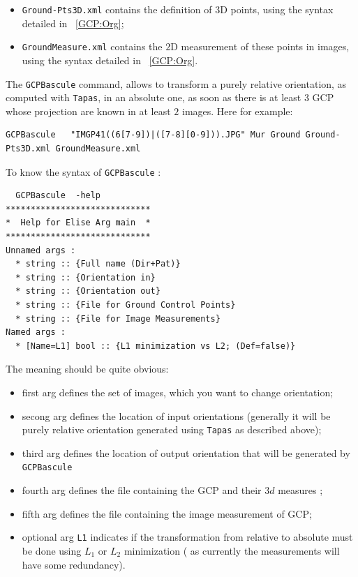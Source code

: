 \begin{itemize}
  \item {\tt Ground-Pts3D.xml} contains the definition of $3$D points, using
	the syntax detailed in ~\ref{GCP:Org};
  \item {\tt GroundMeasure.xml}  contains the $2$D measurement of these points
	in images, using the syntax detailed in ~\ref{GCP:Org}.
\end{itemize}


The {\tt GCPBascule} command, allows to transform a purely relative orientation,
as computed with {\tt Tapas}, in an absolute one, as soon as there is at least
$3$ GCP whose projection are known in at least $2$  images. Here for example:


\begin{verbatim}
GCPBascule   "IMGP41((6[7-9])|([7-8][0-9])).JPG" Mur Ground Ground-Pts3D.xml GroundMeasure.xml
\end{verbatim}

To know the syntax of {\tt GCPBascule} :
\begin{verbatim}
  GCPBascule  -help
*****************************
*  Help for Elise Arg main  *
*****************************
Unnamed args :
  * string :: {Full name (Dir+Pat)}
  * string :: {Orientation in}
  * string :: {Orientation out}
  * string :: {File for Ground Control Points}
  * string :: {File for Image Measurements}
Named args :
  * [Name=L1] bool :: {L1 minimization vs L2; (Def=false)}
\end{verbatim}


The meaning should be quite obvious:

\begin{itemize}
  \item  first arg defines the set of images, which you want to change orientation;
  \item  secong arg defines the location of input orientations (generally it will be purely relative
	 orientation generated using {\tt Tapas} as described above);


  \item  third arg defines the location of output orientation that will be generated by {\tt GCPBascule}

  \item fourth arg defines the file containing the GCP and their $3d$ measures ;
  \item fifth arg defines the file containing the image measurement of GCP;
  \item  optional arg {\tt L1} indicates if the transformation from relative to absolute
	 must be done using $L_1$ or $L_2$ minimization ( as currently the  measurements
	 will have some redundancy).
\end{itemize}

